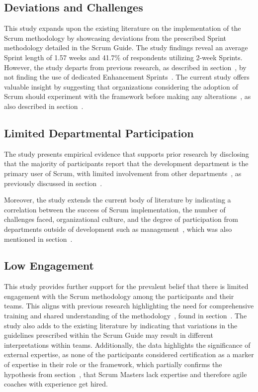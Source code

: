 \subsection*{Deviations and Challenges}\label{subsec:DeviationsandChallenges}
This study expands upon the existing literature on the implementation of the Scrum \gls{methodology} by showcasing deviations from the prescribed Sprint \gls{methodology} detailed in the Scrum Guide. The study findings reveal an average Sprint length of 1.57 weeks and 41.7\% of respondents utilizing 2-week Sprints. However, the study departs from previous research, as described in section~, by not finding the use of dedicated Enhancement Sprints~\cite[p.~2]{Sutherland2005Fos}. The current study offers valuable insight by suggesting that organizations considering the \gls{adoption} of Scrum should experiment with the \gls{framework} before making any alterations~\cite[pp.~9--13]{Wang2018Taa}, as also described in section~.

\subsection*{Limited Departmental Participation}\label{subsec:LimitedDepartmentalParticipation}
The study presents empirical evidence that supports prior research by disclosing that the majority of participants report that the development department is the primary user of Scrum, with limited involvement from other departments~\cite[p.~233]{Rubin2012ESA}, as previously discussed in section~.

Moreover, the study extends the current body of literature by indicating a correlation between the success of Scrum implementation, the number of challenges faced, organizational culture, and the degree of participation from departments outside of development such as management~\cite[p.~125]{Moreira2013AtA}, which was also mentioned in section~.

\subsection*{Low Engagement}\label{subsec:LowEngagement}
This study provides further support for the prevalent belief that there is limited engagement with the Scrum \gls{methodology} among the participants and their teams. This aligns with previous research highlighting the need for comprehensive training and shared understanding of the \gls{methodology}~\cite[p.~72]{Maximini2018ISi}, found in section~. The study also adds to the existing literature by indicating that variations in the \glspl{guideline} prescribed within the Scrum Guide may result in different interpretations within teams. Additionally, the data highlights the significance of external expertise, as none of the participants considered certification as a marker of expertise in their role or the \gls{framework}, which partially confirms the hypothesis from section~, that Scrum Masters lack expertise and therefore \gls{agile} coaches with experience get hired.

